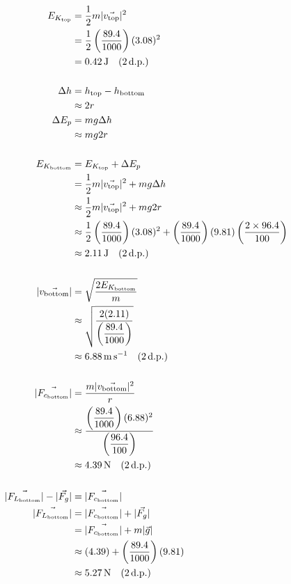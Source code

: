 \documentclass[11pt, a4paper]{article}
\begin{document}
	\begin{align}
		E_{K_{\text{top}}}&=\frac{1}{2}m|\vec{v_{\text{top}}}|^2\\
		&=\frac{1}{2}\left(\frac{89.4}{1000}\right)(3.08)^2\\
		&=\SI{0.42}{\joule} \quad (2\, \text{d.p.})\\[\baselineskip]
		\Delta h&=h_{\text{top}}-h_{\text{bottom}}\\
		&\approx2r\\
		\Delta E_p&=mg\Delta h\\
		&\approx mg2r\\[\baselineskip]
		E_{K_{\text{bottom}}}&=E_{K_{\text{top}}}+\Delta E_p\\
		&=\frac{1}{2}m|\vec{v_{\text{top}}}|^2+mg\Delta h\\
		&\approx \frac{1}{2}m|\vec{v_{\text{top}}}|^2+mg2r\\
		&\approx \frac{1}{2}\left(\frac{89.4}{1000}\right)(3.08)^2 + \left(\frac{89.4}{1000}\right)(9.81)\left(\frac{2\times96.4}{100}\right)\\
		&\approx \SI{2.11}{\joule} \quad (2\, \text{d.p.})\\[\baselineskip]
		|\vec{v_{\text{bottom}}}|&=\sqrt{\frac{2E_{K_{\text{bottom}}}}{m}}\\
		&\approx \sqrt{\frac{2(2.11)}{\left(\dfrac{89.4}{1000}\right)}}\\
		&\approx \SI{6.88}{\meter\per\second} \quad (2\, \text{d.p.})\\[\baselineskip]
		|\vec{F_{c_{\text{bottom}}}}|&=\frac{m|\vec{v_{\text{bottom}}}|^2}{r}\\
		&\approx\frac{\left(\dfrac{89.4}{1000}\right)(6.88)^2}{\left(\dfrac{96.4}{100}
			\right)}\\
		&\approx \SI{4.39}{\newton} \quad (2\, \text{d.p.})\\[\baselineskip]
		|\vec{F_{L_\text{bottom}}}|-|\vec{F_g}|&=|\vec{F_{c_\text{bottom}}}|\\
		|\vec{F_{L_{\text{bottom}}}}|&=|\vec{F_{c_{\text{bottom}}}}|+|\vec{F_g}|\\
		&=|\vec{F_{c_{\text{bottom}}}}|+m|\vec{g}|\\
		&\approx(4.39)+\left(\frac{89.4}{1000}\right)(9.81)\\
		&\approx \SI{5.27}{\newton} \quad (2\, \text{d.p.})
	\end{align}
	
\end{document}
